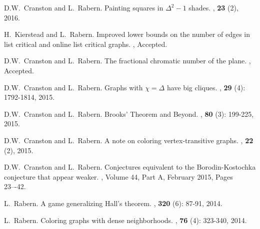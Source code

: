 \documentclass[margin,line]{res}
\begin{document}
\begin{resume}
\begin{enumerate}[{[}1{]}]
\item
D.W.~Cranston and L.~Rabern.
\newblock Painting squares in $\Delta^2 - 1$ shades.
, \textbf{23} (2), 2016.
	
	\smallskip
	
	\item
H.~Kierstead and L.~Rabern.
\newblock Improved lower bounds on the number of edges in list critical and online list critical graphs.
, Accepted.

\smallskip
	
	\item
	D.W.~Cranston and L.~Rabern.
	\newblock The fractional chromatic number of the plane.
	, Accepted.
	\smallskip
	
	\item
	D.W.~Cranston and L.~Rabern.
	\newblock Graphs with $\chi = \Delta$ have big cliques.
	, \textbf{29} (4): 1792-1814, 2015.
	\smallskip
	
	\item
	D.W.~Cranston and L.~Rabern.
	\newblock Brooks' Theorem and Beyond.
	, \textbf{80} (3): 199-225, 2015.
	
	\smallskip
	
\item D.W.~Cranston and L.~Rabern.
\newblock A note on coloring vertex-transitive graphs.
, \textbf{22} (2), 2015.

\smallskip

\item
D.W.~Cranston and L.~Rabern.
\newblock Conjectures equivalent to the Borodin-Kostochka conjecture that appear weaker.
, Volume 44, Part A, February 2015, Pages 23–-42.

\smallskip

\item
L.~Rabern.
\newblock A game generalizing Hall's theorem.
, \textbf{320} (6): 87-91, 2014.

\smallskip

\item
L.~Rabern.
\newblock Coloring graphs with dense neighborhoods.
, \textbf{76} (4): 323-340, 2014.

\smallskip


\end{enumerate}
\end{resume}
\end{document}
